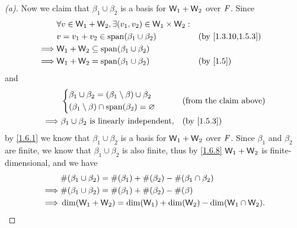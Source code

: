 \begin{proof}[(a)]
  Now we claim that \(\beta_1 \cup \beta_2\) is a basis for \(\mathsf{W}_1 + \mathsf{W}_2\) over \(\mathit{F}\).
  Since
  \begin{align*}
             & \forall v \in \W_1 + \W_2, \exists (v_1, v_2) \in \W_1 \times \W_2 :                        \\
             & v = v_1 + v_2 \in \spn{\beta_1 \cup \beta_2}                         &  & \by{1.3.10,1.5.3} \\
    \implies & \W_1 + \W_2 \subseteq \spn{\beta_1 \cup \beta_2}                                            \\
    \implies & \W_1 + \W_2 = \spn{\beta_1 \cup \beta_2}                             &  & \by{1.5}
  \end{align*}
  and
  \begin{align*}
             & \begin{dcases}
                 \beta_1 \cup \beta_2 = (\beta_1 \setminus \beta) \cup \beta_2 \\
                 (\beta_1 \setminus \beta) \cap \spn{\beta_2} = \varnothing
               \end{dcases} &  & \text{(from the claim above)}                    \\
    \implies & \beta_1 \cup \beta_2 \text{ is linearly independent},            &  & \by{1.5.3}
  \end{align*}
  by \cref{1.6.1} we know that \(\beta_1 \cup \beta_2\) is a basis for \(\mathsf{W}_1 + \mathsf{W}_2\) over \(\mathit{F}\).
  Since \(\beta_1\) and \(\beta_2\) are finite, we know that \(\beta_1 \cup \beta_2\) is also finite, thus by \cref{1.6.8} \(\mathsf{W}_1 + \mathsf{W}_2\) is finite-dimensional, and we have
  \begin{align*}
             & \#(\beta_1 \cup \beta_2) = \#(\beta_1) + \#(\beta_2) - \#(\beta_1 \cap \beta_2) \\
    \implies & \#(\beta_1 \cup \beta_2) = \#(\beta_1) + \#(\beta_2) - \#(\beta)                \\
    \implies & \dim(\mathsf{W}_1 + \mathsf{W}_2) = \dim(\mathsf{W}_1) + \dim(\mathsf{W}_2) - \dim(\mathsf{W}_1 \cap \mathsf{W}_2).
  \end{align*}
\end{proof}

